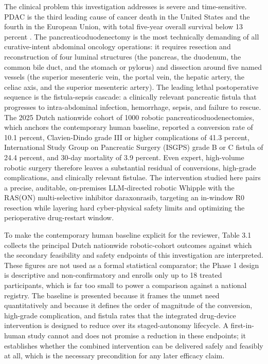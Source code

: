 The clinical problem this investigation addresses is severe and time-sensitive.
PDAC is the third leading cause of cancer death in the United States and the fourth
in the European Union, with total five-year overall survival below 13 percent
\cite{pdac060s2030}. The pancreaticoduodenectomy is the most technically demanding
of all curative-intent abdominal oncology operations: it requires resection and
reconstruction of four luminal structures (the pancreas, the duodenum, the common
bile duct, and the stomach or pylorus) and dissection around five named vessels
(the superior mesenteric vein, the portal vein, the hepatic artery, the celiac
axis, and the superior mesenteric artery). The leading lethal postoperative
sequence is the fistula-sepsis cascade: a clinically relevant pancreatic fistula
that progresses to intra-abdominal infection, hemorrhage, sepsis, and failure to
rescue. The 2025 Dutch nationwide cohort of 1000 robotic
pancreaticoduodenectomies, which anchors the contemporary human baseline, reported
a conversion rate of 10.1 percent, Clavien-Dindo grade III or higher complications
of 41.3 percent, International Study Group on Pancreatic Surgery (ISGPS) grade B or
C fistula of 24.4 percent, and 30-day mortality of 3.9 percent. Even expert,
high-volume robotic surgery therefore leaves a substantial residual of conversions,
high-grade complications, and clinically relevant fistulae. The intervention
studied here pairs a precise, auditable, on-premises LLM-directed robotic Whipple
with the RAS(ON) multi-selective inhibitor daraxonrasib, targeting an in-window R0
resection while layering hard cyber-physical safety limits and optimizing the
perioperative drug-restart window.

To make the contemporary human baseline explicit for the reviewer, Table 3.1
collects the principal Dutch nationwide robotic-cohort outcomes against which the
secondary feasibility and safety endpoints of this investigation are interpreted.
These figures are not used as a formal statistical comparator; the Phase 1 design
is descriptive and non-confirmatory and enrolls only up to 18 treated participants,
which is far too small to power a comparison against a national registry. The
baseline is presented because it frames the unmet need quantitatively and because
it defines the order of magnitude of the conversion, high-grade complication, and
fistula rates that the integrated drug-device intervention is designed to reduce
over its staged-autonomy lifecycle. A first-in-human study cannot and does not
promise a reduction in these endpoints; it establishes whether the combined
intervention can be delivered safely and feasibly at all, which is the necessary
precondition for any later efficacy claim.

